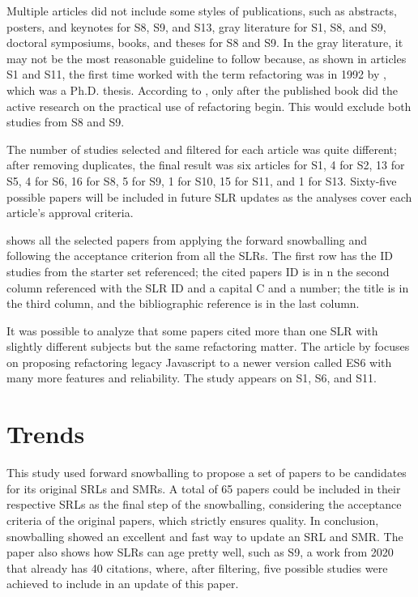 Multiple articles did not include some styles of publications, such as abstracts, posters, and keynotes for S8, S9, and S13, gray literature for S1, S8, and S9, doctoral symposiums, books, and theses for S8 and S9. In the gray literature, it may not be the most reasonable guideline to follow because, as shown in articles S1 and S11, the first time worked with the term refactoring was in 1992 by \textcite{Opdyke1992}, which was a Ph.D. thesis. According to \textcite{Buriakovskyi2018}, only after the published book \textcite{fowler2018refactoring} did the active research on the practical use of refactoring begin. This would exclude both studies from S8 and S9.

The number of studies selected and filtered for each article was quite different; after removing duplicates, the final result was six articles for S1, 4 for S2, 13 for S5, 4 for S6, 16 for S8, 5 for S9, 1 for S10, 15 for S11, and 1 for S13. Sixty-five possible papers will be included in future SLR updates as the analyses cover each article's approval criteria.

  shows all the selected papers from applying the forward snowballing and following the acceptance criterion from all the SLRs. The first row has the ID studies from the starter set referenced; the cited papers ID is in n the second column referenced with the SLR ID and a capital C and a number; the title is in the third column, and the bibliographic reference is in the last column.



It was possible to analyze that some papers cited more than one SLR with slightly different subjects but the same refactoring matter. The article by \textcite{Paltoglou2021} focuses on proposing refactoring legacy Javascript to a newer version called ES6 with many more features and reliability. The study appears on S1, S6, and S11.


\section{Trends}
\label{sec-trends}
This study used forward snowballing to propose a set of papers to be candidates for its original SRLs and SMRs.
A total of 65 papers could be included in their respective SRLs as the final step of the snowballing, considering the acceptance criteria of the original papers, which strictly ensures quality. In conclusion, snowballing showed an excellent and fast way to update an SRL and SMR.
The paper also shows how SLRs can age pretty well, such as S9, a work from 2020 that already has 40 citations, where, after filtering, five possible studies were achieved to include in an update of this paper.

